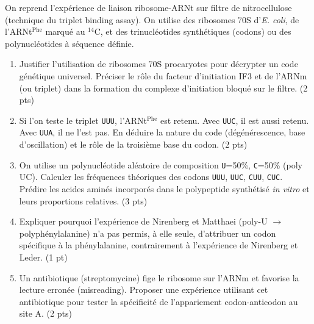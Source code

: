 \documentclass[11pt]{article}
\begin{document}
\begin{exercice}
On reprend l'expérience de liaison ribosome-ARNt sur filtre de nitrocellulose (technique du triplet binding assay). On utilise des ribosomes 70S d'\textit{E. coli}, de l'ARNt$^{\text{Phe}}$ marqué au $^{14}$C, et des trinucléotides synthétiques (codons) ou des polynucléotides à séquence définie.

\begin{enumerate}
    \item Justifier l'utilisation de ribosomes 70S procaryotes pour décrypter un code génétique universel. Préciser le rôle du facteur d'initiation IF3 et de l'ARNm (ou triplet) dans la formation du complexe d'initiation bloqué sur le filtre. (2 pts)
    \item Si l'on teste le triplet \texttt{UUU}, l'ARNt$^{\text{Phe}}$ est retenu. Avec \texttt{UUC}, il est aussi retenu. Avec \texttt{UUA}, il ne l'est pas. En déduire la nature du code (dégénérescence, base d'oscillation) et le rôle de la troisième base du codon. (2 pts)
    \item On utilise un polynucléotide aléatoire de composition \texttt{U}=50\%, \texttt{C}=50\% (poly UC). Calculer les fréquences théoriques des codons \texttt{UUU}, \texttt{UUC}, \texttt{CUU}, \texttt{CUC}. Prédire les acides aminés incorporés dans le polypeptide synthétisé \textit{in vitro} et leurs proportions relatives. (3 pts)
    \item Expliquer pourquoi l'expérience de Nirenberg et Matthaei (poly-U $\rightarrow$ polyphénylalanine) n'a pas permis, à elle seule, d'attribuer un codon spécifique à la phénylalanine, contrairement à l'expérience de Nirenberg et Leder. (1 pt)
    \item Un antibiotique (streptomycine) fige le ribosome sur l'ARNm et favorise la lecture erronée (misreading). Proposer une expérience utilisant cet antibiotique pour tester la spécificité de l'appariement codon-anticodon au site A. (2 pts)
\end{enumerate}
\end{exercice}
\end{document}
